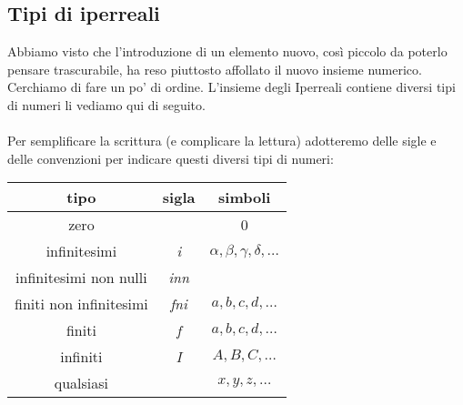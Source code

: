 \subsection{Tipi di iperreali}
\label{subsec:insnum_iperreali}

Abbiamo visto che l'introduzione di un elemento nuovo, così piccolo
da poterlo pensare trascurabile, ha reso piuttosto affollato il nuovo 
insieme numerico. 
Cerchiamo di fare un po' di ordine. 
L'insieme degli Iperreali contiene diversi tipi di numeri li vediamo qui di 
seguito. \\[.5em]

 \\[1em]
Per semplificare la scrittura (e complicare la lettura) adotteremo delle 
sigle e delle convenzioni per indicare questi diversi tipi di numeri:

\begin{center}
\begin{tabular}{ccc}\toprule
tipo & sigla & simboli \\\midrule

zero &  & 0 \\

infinitesimi & \emph{i} & 
\(\alpha, \beta, \gamma, \delta, \dots\) \\

infinitesimi non nulli & \emph{inn} & \\

finiti non infinitesimi & \emph{fni} & \(a, b, c, d, \dots\)\\

finiti & \emph{f} & \(a, b, c, d, \dots\) \\

infiniti & \emph{I} & \(A, B, C, \dots\)\\

qualsiasi &  & \(x, y, z, \dots\) \\\bottomrule
\end{tabular}
\label{tab:insnum_tipi}
\end{center}

